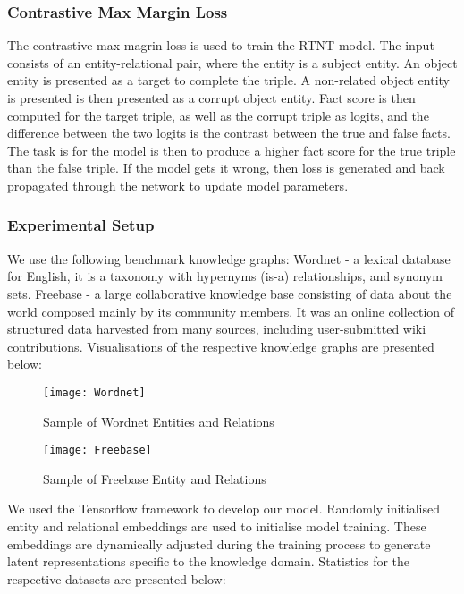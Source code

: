 \subsubsection{Contrastive Max Margin Loss}
The contrastive max-magrin loss \cite{reference} is used to train the RTNT model. The input consists of an entity-relational pair, where the entity is a subject entity. An object entity is presented as a target to complete the triple. A non-related object entity is presented is then presented as a corrupt object entity. Fact score is then computed for the target triple, as well as the corrupt triple as logits, and the difference between the two logits is the contrast between the true and false facts. The task is for the model is then to produce a higher fact score for the true triple than the false triple. If the model gets it wrong, then loss is generated and back propagated through the network to update model parameters. \newline

\subsubsection{Experimental Setup} 

We use the following benchmark knowledge graphs: Wordnet - a lexical database for English, it is a taxonomy with hypernyms (is-a) relationships, and synonym sets. \newline
Freebase - a large collaborative knowledge base consisting of data about the world composed mainly by its community members. It was an online collection of structured data harvested from many sources, including user-submitted wiki contributions. \newline
Visualisations of the respective knowledge graphs are presented below:

\begin{figure}[H]
  	\caption{Sample of Wordnet Entities and Relations}
   	\centering
    	\texttt{[image: Wordnet]}
\end{figure}

\begin{figure}[H]
  	\caption{Sample of Freebase Entity and Relations}
   	\centering
    	\texttt{[image: Freebase]}
\end{figure}


We used the Tensorflow framework to develop our model. Randomly initialised entity and relational embeddings are used to initialise model training. These embeddings are dynamically adjusted during the training process to generate latent representations specific to the knowledge domain. Statistics for the respective datasets are presented below:


